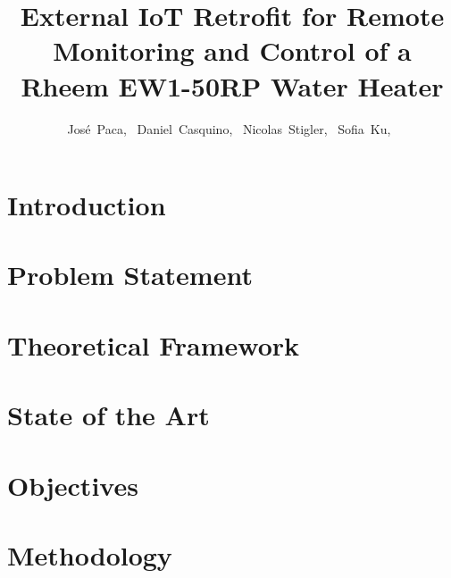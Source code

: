\documentclass[journal]{IEEEtran}
\begin{document}
\title{External IoT Retrofit for Remote Monitoring and Control of a Rheem EW1-50RP Water Heater}

\author{José~Paca,~
  Daniel~Casquino,~
  Nicolas~Stigler,~
  Sofia~Ku,~
}

%

\maketitle

\IEEEpeerreviewmaketitle{}

\section{Introduction}


\section{Problem Statement}


\section{Theoretical Framework}


\section{State of the Art}


\section{Objectives}


\section{Methodology}


\ifCLASSOPTIONcaptionsoff{}
\newpage
\fi
\clearpage

\newpage


\end{document}

